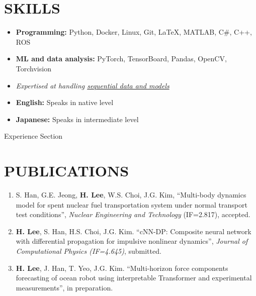 \documentclass[a4paper,10pt]{extarticle}
\begin{document}
\section*{SKILLS}
\begin{itemize}
    \item \textbf{Programming: }Python, Docker, Linux, Git, \LaTeX, MATLAB, C\#, C++, ROS
    \item \textbf{ML and data analysis:} PyTorch, TensorBoard, Pandas, OpenCV, Torchvision
    \item \textit{Expertised at handling \underline{sequential data and models}}
    \item \textbf{English: }Speaks in native level
    \item \textbf{Japanese: }Speaks in intermediate level
\end{itemize}


Experience Section
\section*{PUBLICATIONS}
\noindent
\begin{enumerate}[leftmargin=.5cm]
    \item S. Han, G.E. Jeong, \textbf{H. Lee}, W.S. Choi, J.G. Kim, “Multi-body dynamics model for spent nuclear fuel transportation system under normal transport test conditions”, \textit{Nuclear Engineering and Technology} (IF=2.817), accepted.
    \item \textbf{H. Lee}, S. Han, H.S. Choi, J.G. Kim. “cNN-DP: Composite neural network with differential propagation for impulsive nonlinear dynamics”, \textit{Journal of Computational Physics (IF=4.645)}, submitted.
    \item \textbf{H. Lee}, J. Han, T. Yeo, J.G. Kim. “Multi-horizon force components forecasting of ocean robot using interpretable Transformer and experimental measurements”, in preparation.
\end{enumerate}

\end{document}
